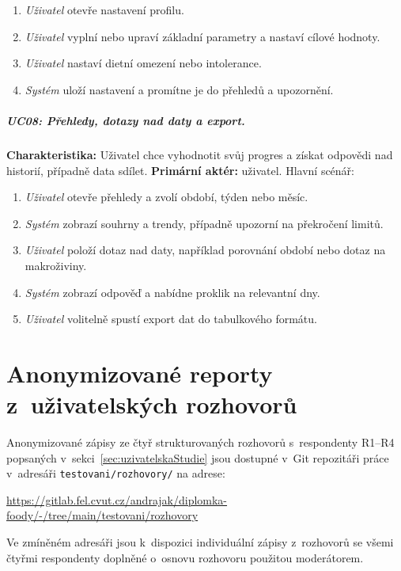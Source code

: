 \begin{enumerate}
	\item \emph{Uživatel} otevře nastavení profilu.
	\item \emph{Uživatel} vyplní nebo upraví základní parametry a nastaví cílové hodnoty.
	\item \emph{Uživatel} nastaví dietní omezení nebo intolerance.
	\item \emph{Systém} uloží nastavení a promítne je do přehledů a upozornění.
\end{enumerate}

\paragraph{UC08: Přehledy, dotazy nad daty a export.}
\textbf{Charakteristika:} Uživatel chce vyhodnotit svůj progres a získat odpovědi nad historií, případně data sdílet.
\textbf{Primární aktér:} uživatel.
Hlavní scénář:

\begin{enumerate}
	\item \emph{Uživatel} otevře přehledy a zvolí období, týden nebo měsíc.
	\item \emph{Systém} zobrazí souhrny a trendy, případně upozorní na překročení limitů.
	\item \emph{Uživatel} položí dotaz nad daty, například porovnání období nebo dotaz na makroživiny.
	\item \emph{Systém} zobrazí odpověď a nabídne proklik na relevantní dny.
	\item \emph{Uživatel} volitelně spustí export dat do tabulkového formátu.
\end{enumerate}

\chapter{Anonymizované reporty z~uživatelských rozhovorů}
\label{app:rozhovory}

Anonymizované zápisy ze čtyř strukturovaných rozhovorů s~respondenty R1--R4 popsaných v~sekci~\ref{sec:uzivatelskaStudie} jsou dostupné v~Git repozitáři práce v~adresáři \texttt{testovani/rozhovory/} na adrese:

\begin{center}
\url{https://gitlab.fel.cvut.cz/andrajak/diplomka-foody/-/tree/main/testovani/rozhovory}
\end{center}

Ve zmíněném adresáři jsou k~dispozici individuální zápisy z~rozhovorů se všemi čtyřmi respondenty doplněné o~osnovu rozhovoru použitou moderátorem.


